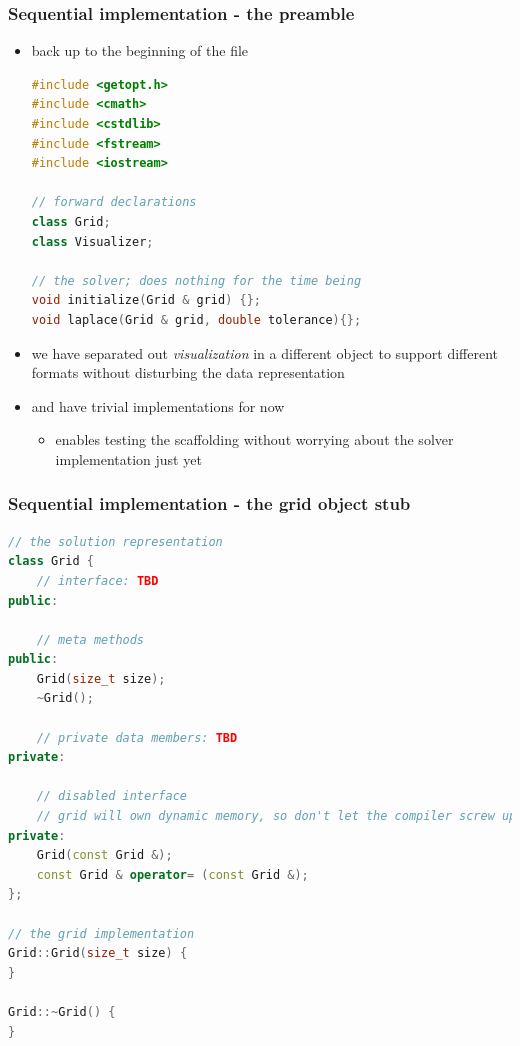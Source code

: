 \begin{frame}[fragile]
%
  \frametitle{Sequential implementation - the preamble}
%
  \begin{itemize}
  \item back up to the beginning of the file
    \begin{lstlisting}[language=c++,name=seq:frame, firstnumber=1]
#include <getopt.h>
#include <cmath>
#include <cstdlib>
#include <fstream>
#include <iostream>

// forward declarations
class Grid;
class Visualizer;

// the solver; does nothing for the time being
void initialize(Grid & grid) {};
void laplace(Grid & grid, double tolerance){};

    \end{lstlisting}
%
  \item we have separated out {\em visualization} in a different object to support different
    formats without disturbing the data representation
%
  \item {} and  have trivial implementations for now
    \begin{itemize}
    \item enables testing the scaffolding without worrying about the solver
      implementation just yet
    \end{itemize}
  \end{itemize}
% 
\end{frame}

\begin{frame}[fragile]
%
  \frametitle{Sequential implementation - the grid object stub}
%
  \begin{lstlisting}[language=c++,name=seq:frame]
// the solution representation
class Grid {
    // interface: TBD
public:

    // meta methods
public:
    Grid(size_t size);
    ~Grid();

    // private data members: TBD
private:

    // disabled interface
    // grid will own dynamic memory, so don't let the compiler screw up
private:
    Grid(const Grid &);
    const Grid & operator= (const Grid &);
};

// the grid implementation
Grid::Grid(size_t size) {
}

Grid::~Grid() {
}

  \end{lstlisting}
% 
\end{frame}

